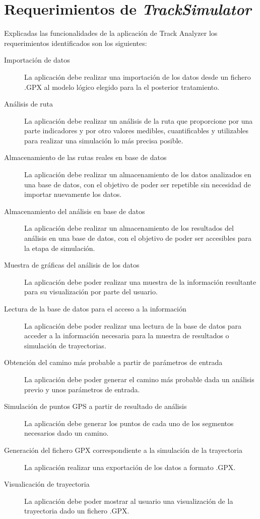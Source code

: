 \section{Requerimientos de \textit{TrackSimulator}}
\label{section: RequerimientosTrackSimulator}
Explicadas las funcionalidades de la aplicación de Track Analyzer los requerimientos identificados son los siguientes:
\begin{description}
\item[Importación de datos] La aplicación debe realizar una importación de los datos desde un fichero .\ac{GPX} al modelo lógico elegido para la el posterior tratamiento.
\item[Análisis de ruta] La aplicación debe realizar un análisis de la ruta que proporcione por una parte indicadores y por otro valores medibles, cuantificables y utilizables para realizar una simulación 
lo más precisa posible.
\item[Almacenamiento de las rutas reales en base de datos] La aplicación debe realizar un almacenamiento de los datos analizados en una base de datos, con el objetivo de poder ser repetible
sin necesidad de importar nuevamente los datos.
\item[Almacenamiento del análisis en base de datos] La aplicación debe realizar un almacenamiento de los resultados del análisis en una base de datos, con el objetivo de poder ser accesibles para la
etapa de simulación.
\item[Muestra de gráficas del análisis de los datos] La aplicación debe poder realizar una muestra de la información resultante para su visualización por parte del usuario.
\item[Lectura de la base de datos para el acceso a la información] La aplicación debe poder realizar una lectura de la base de datos para acceder a la información necesaria para la muestra de resultados o 
simulación de trayectorias.
\item[Obtención del camino más probable a partir de parámetros de entrada] La aplicación debe poder generar el camino más probable dada un análisis previo y unos parámetros de entrada.
\item[Simulación de puntos \ac{GPS} a partir de resultado de análisis] La aplicación debe generar los puntos de cada uno de los segmentos necesarios dado un camino.
\item[Generación del fichero GPX correspondiente a la simulación de la trayectoria] La aplicación realizar una exportación de los datos a formato .\ac{GPX}.
\item[Visualicación de trayectoria] La aplicación debe poder mostrar al usuario una visualización de la trayectoria dado un fichero .\ac{GPX}.
\end{description}

